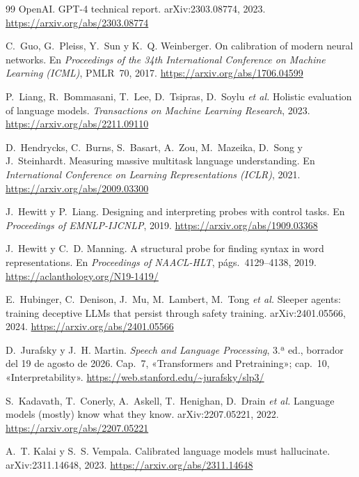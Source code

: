 \begin{thebibliography}{99}
OpenAI.
\newblock GPT-4 technical report.
\newblock arXiv:2303.08774, 2023.
\newblock \url{https://arxiv.org/abs/2303.08774}

C.~Guo, G.~Pleiss, Y.~Sun y K.~Q. Weinberger.
\newblock On calibration of modern neural networks.
\newblock En \emph{Proceedings of the 34th International Conference on Machine Learning (ICML)}, PMLR~70, 2017.
\newblock \url{https://arxiv.org/abs/1706.04599}

P.~Liang, R.~Bommasani, T.~Lee, D.~Tsipras, D.~Soylu \emph{et al.}
\newblock Holistic evaluation of language models.
\newblock \emph{Transactions on Machine Learning Research}, 2023.
\newblock \url{https://arxiv.org/abs/2211.09110}

D.~Hendrycks, C.~Burns, S.~Basart, A.~Zou, M.~Mazeika, D.~Song y J.~Steinhardt.
\newblock Measuring massive multitask language understanding.
\newblock En \emph{International Conference on Learning Representations (ICLR)}, 2021.
\newblock \url{https://arxiv.org/abs/2009.03300}

J.~Hewitt y P.~Liang.
\newblock Designing and interpreting probes with control tasks.
\newblock En \emph{Proceedings of EMNLP-IJCNLP}, 2019.
\newblock \url{https://arxiv.org/abs/1909.03368}

J.~Hewitt y C.~D. Manning.
\newblock A structural probe for finding syntax in word representations.
\newblock En \emph{Proceedings of NAACL-HLT}, págs.~4129--4138, 2019.
\newblock \url{https://aclanthology.org/N19-1419/}

E.~Hubinger, C.~Denison, J.~Mu, M.~Lambert, M.~Tong \emph{et al.}
\newblock Sleeper agents: training deceptive LLMs that persist through safety training.
\newblock arXiv:2401.05566, 2024.
\newblock \url{https://arxiv.org/abs/2401.05566}

D.~Jurafsky y J.~H. Martin.
\newblock \emph{Speech and Language Processing}, 3.ª ed., borrador del 19 de agosto de 2026.
\newblock Cap.~7, «Transformers and Pretraining»; cap.~10, «Interpretability».
\newblock \url{https://web.stanford.edu/~jurafsky/slp3/}

S.~Kadavath, T.~Conerly, A.~Askell, T.~Henighan, D.~Drain \emph{et al.}
\newblock Language models (mostly) know what they know.
\newblock arXiv:2207.05221, 2022.
\newblock \url{https://arxiv.org/abs/2207.05221}

A.~T. Kalai y S.~S. Vempala.
\newblock Calibrated language models must hallucinate.
\newblock arXiv:2311.14648, 2023.
\newblock \url{https://arxiv.org/abs/2311.14648}


\end{thebibliography}
